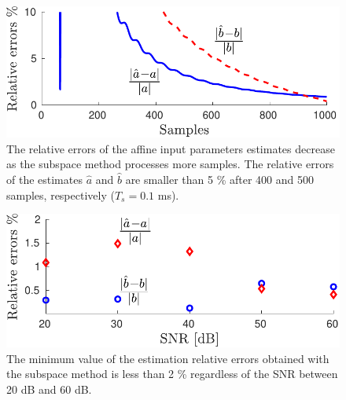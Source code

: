 {{\begin{figure}[!htbp]
\centering
\includegraphics[width=1\columnwidth]{./ChapterRampInput/fig/Fig_3.pdf} 
\caption{ \label{fig:rele_dd_40dB_s1} The relative errors of the affine input parameters estimates decrease as the subspace method processes more samples. The relative errors of the estimates $\widehat{a}$ and $\widehat{b}$ are smaller than 5 \% after 400 and 500 samples, respectively ($T_s = 0.1$ ms). }
\end{figure}


\begin{figure}[!htbp]
\centering
\includegraphics[width=1\columnwidth]{./ChapterRampInput/fig/Fig_4.pdf} 
\caption{ \label{fig:rele_SNR_dd_10000} The minimum value of the estimation relative errors obtained with the subspace method is less than 2  \% regardless of the SNR between 20 dB and 60 dB. }
\end{figure}

}}
